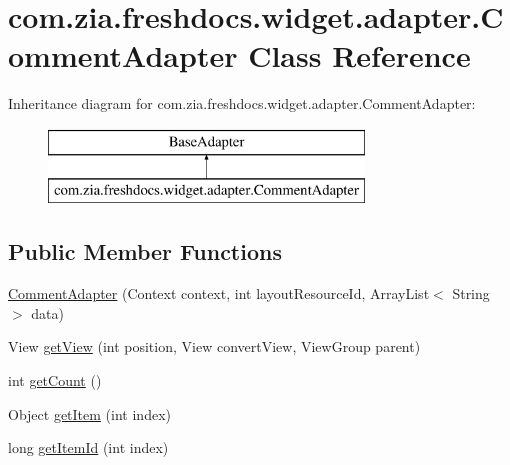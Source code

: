 \hypertarget{classcom_1_1zia_1_1freshdocs_1_1widget_1_1adapter_1_1_comment_adapter}{\section{com.\-zia.\-freshdocs.\-widget.\-adapter.\-Comment\-Adapter Class Reference}
\label{classcom_1_1zia_1_1freshdocs_1_1widget_1_1adapter_1_1_comment_adapter}
}
Inheritance diagram for com.\-zia.\-freshdocs.\-widget.\-adapter.\-Comment\-Adapter\-:\begin{figure}[H]
\begin{center}
\leavevmode
\includegraphics[height=2.000000cm]{classcom_1_1zia_1_1freshdocs_1_1widget_1_1adapter_1_1_comment_adapter}
\end{center}
\end{figure}
\subsection*{Public Member Functions}
\begin{DoxyCompactItemize}
\item 
\hyperlink{classcom_1_1zia_1_1freshdocs_1_1widget_1_1adapter_1_1_comment_adapter_af5887129e3679873dce72b9b6e29d615}{Comment\-Adapter} (Context context, int layout\-Resource\-Id, Array\-List$<$ String $>$ data)
\item 
View \hyperlink{classcom_1_1zia_1_1freshdocs_1_1widget_1_1adapter_1_1_comment_adapter_ab30c067c5ddd1024fd8fc38c160f6707}{get\-View} (int position, View convert\-View, View\-Group parent)
\item 
int \hyperlink{classcom_1_1zia_1_1freshdocs_1_1widget_1_1adapter_1_1_comment_adapter_a1906262722cf38a1f29eb959d68f0b59}{get\-Count} ()
\item 
Object \hyperlink{classcom_1_1zia_1_1freshdocs_1_1widget_1_1adapter_1_1_comment_adapter_ac5ac1b47cafed5ffa28f59540cd2d730}{get\-Item} (int index)
\item 
long \hyperlink{classcom_1_1zia_1_1freshdocs_1_1widget_1_1adapter_1_1_comment_adapter_a5e5add31b2f6383697103659e6547238}{get\-Item\-Id} (int index)
\end{DoxyCompactItemize}


